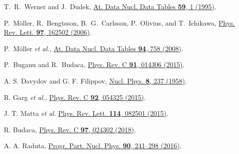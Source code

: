 \documentclass[a4paper, 10pt, twocolumn]{article}
\begin{document}
\begin{thebibliography}{9}%
		T.~R.~Werner and J.~Dudek,
		\href {https://doi.org/10.1006/adnd.1995.1001}
		{At. Data Nucl. Data Tables \textbf{59}, 1 (1995)}.

		P.~Möller, R.~Bengtsson, B.~G.~Carlsson, P.~Olivius, and T.~Ichikawa,
		\href{https://doi.org/10.1103/PhysRevLett.97.162502}
		{Phys. Rev. Lett. \textbf{97}, 162502 (2006)}.

		P.~Möller \textit{et al.},
		\href{https://doi.org/10.1016/j.adt.2008.05.002}
		{At. Data Nucl. Data Tables \textbf{94}, 758 (2008)}.

		
		P.~Buganu and R.~Budaca,
		\href{https://doi.org/10.1103/PhysRevC.91.014306}
		{Phys. Rev. C \textbf{91}, 014306 (2015)}.

		A. S. Davydov and G. F. Filippov,
		\href{https://doi.org/10.1016/0029-5582(58)90153-6}
		{Nucl. Phys. \textbf{8}, 237 (1958)}.


		R. Garg \textit{et al.},
		\href{https://doi.org/10.1103/PhysRevC.92.054325}
		{Phys. Rev. C \textbf{92}, 054325 (2015)}.

		J. T. Matta \textit{et al}.
		\href{https://doi.org/10.1103/PhysRevLett.114.082501}
		{Phys. Rev. Lett. \textbf{114}, 082501 (2015)}.

		R. Budaca,
		\href{https://doi.org/10.1103/PhysRevC.97.024302}
		{Phys. Rev. C \textbf{97}, 024302 (2018)}.


		A. A. Raduta,
		\href{https://doi.org/10.1016/j.ppnp.2016.05.002}
		{Progr. Part. Nucl. Phys. \textbf{90}, 241–298 (2016)}.

\end{thebibliography}%
\end{document}
